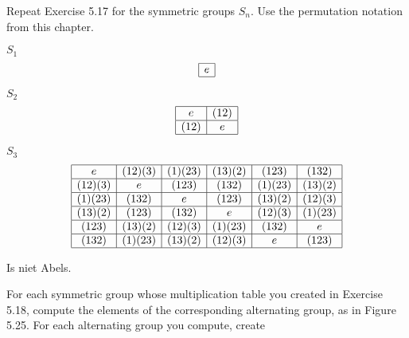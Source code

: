 \documentclass[11pt]{exam}
\begin{document}
\begin{questions}
	\question Repeat Exercise 5.17 for the symmetric groups $S_n$. Use the permutation notation from this chapter.
	\begin{solution}
		\par $S_1$
		\[
			\begin{array}{|c|}
			\hline
			e\\
			\hline
			\end{array}
		\]
		\par $S_2$
		\[
			\begin{array}{|c|c|}
			\hline
			e& (1 2)\\
			\hline
			(1 2) & e\\
			\hline
			\end{array}
		\]
		\par $S_3$
		\[
			\begin{array}{|c|c|c|c|c|c|}
			\hline
			e& (1 2)(3) & (1)(2 3) & (1 3)(2) & (1 2 3) & (1 3 2)\\
			\hline
			(1 2)(3) & e & (123) & (132) & (1)(23)&(13)(2) \\
			\hline
			(1)(23) & (132) & e & (123) & (13)(2) & (12)(3)\\
			\hline
			(13)(2) & (123) & (132) & e & (12)(3) & (1)(23)\\
			\hline
			(123) & (13)(2) & (12)(3) & (1)(23) & (132) & e\\
			\hline
			(132) & (1)(23) & (13)(2) & (12)(3) & e & (123)\\
			\hline
			\end{array}
		\]
		\par Is niet Abels.
	\end{solution}

	\question For each symmetric group whose multiplication table you created in Exercise 5.18, compute the elements of the corresponding alternating group, as in Figure 5.25. For each alternating group you compute, create
\end{questions}
\end{document}
